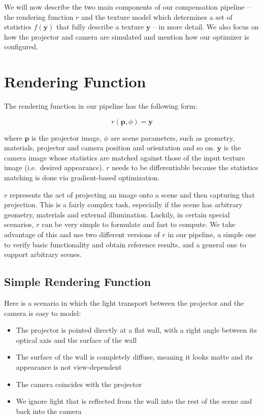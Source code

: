 We will now describe the two main components of our compensation pipeline -- the rendering function \(r\) and the texture model which determines a set of statistics \(f(\bm{y})\) that fully describe a texture \(\bm{y}\) -- in more detail. We also focus on how the projector and camera are simulated and mention how our optimizer is configured.

\section{Rendering Function}
\label{section:methods-rendering_function}

The rendering function in our pipeline has the following form:

\begin{equation}
    \label{eq:rendering_function}
    r(\bm{p}, \phi) = \bm{y}  
\end{equation}

where \(\bm{p}\) is the projector image, \(\phi\) are scene parameters, such as geometry, materials, projector and camera position and orientation and so on. \(\bm{y}\) is the camera image whose statistics are matched against those of the input texture image (i.e.~desired appearance). \(r\) needs to be differentiable because the statistics matching is done via gradient-based optimization.

\(r\) represents the act of projecting an image onto a scene and then capturing that projection. This is a fairly complex task, especially if the scene has arbitrary geometry, materials and external illumination. Luckily, in certain special scenarios, \(r\) can be very simple to formulate and fast to compute. We take advantage of this and use two different versions of \(r\) in our pipeline, a simple one to verify basic functionality and obtain reference results, and a general one to support arbitrary scenes.

\subsection{Simple Rendering Function}
\label{section:methods-rendering_function-simple}

Here is a scenario in which the light transport between the projector and the camera is easy to model:

\begin{itemize}
    \item The projector is pointed directly at a flat wall, with a right angle between its optical axis and the surface of the wall
    \item The surface of the wall is completely diffuse, meaning it looks matte and its appearance is not view-dependent
    \item The camera coincides with the projector
    \item We ignore light that is reflected from the wall into the rest of the scene and back into the camera
\end{itemize}

